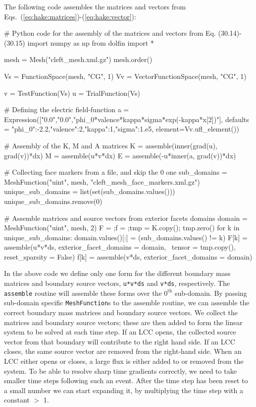 The following \pydolfin code assembles the matrices and vectors from
Eqs.~(\ref{eq:hake:matrices})-(\ref{eq:hake:vector}):
\begin{python}
# Python code for the assembly of the matrices and vectors from Eq. (30.14)-(30.15)
import numpy as np
from dolfin import *

mesh = Mesh("cleft_mesh.xml.gz")
mesh.order()

Vs = FunctionSpace(mesh, "CG", 1)
Vv = VectorFunctionSpace(mesh, "CG", 1)

v = TestFunction(Vs)
u = TrialFunction(Vs)

# Defining the electric field-function
a = Expression(["0.0","0.0","phi_0*valence*kappa*sigma*exp(-kappa*x[2])"],
               defaults = {"phi_0":-2.2,"valence":2,"kappa":1,"sigma":1.e5},
               element=Vv.ufl_element())

# Assembly of the K, M and A matrices
K = assemble(inner(grad(u), grad(v))*dx)
M = assemble(u*v*dx)
E = assemble(-u*inner(a, grad(v))*dx)

# Collecting face markers from a file, and skip the 0 one
sub_domains = MeshFunction("uint", mesh, "cleft_mesh_face_markers.xml.gz")
unique_sub_domains = list(set(sub_domains.values()))
unique_sub_domains.remove(0)

# Assemble matrices and source vectors from exterior facets domains
domain = MeshFunction("uint", mesh, 2)
F = {};f = {};tmp = K.copy(); tmp.zero()
for k in unique_sub_domains:
    domain.values()[:] = (sub_domains.values() != k)
    F[k] = assemble(u*v*ds, exterior_facet_domains = domain, \
                    tensor = tmp.copy(), reset_sparsity = False)
    f[k] = assemble(v*ds, exterior_facet_domains = domain)
\end{python}
In the above code we define only one form for the different boundary
mass matrices and boundary source vectors, \texttt{u*v*ds} and
\texttt{v*ds}, respectively. The \texttt{assemble} routine will
assemble these forms over the $0^{\scriptscriptstyle\text{th}}$
sub-domain. By passing sub-domain specific \texttt{MeshFunction}s to
the assemble routine, we can assemble the correct boundary mass
matrices and boundary source vectors. We collect the matrices and
boundary source vectors; these are then added to form the linear
system to be solved at each time step. If an LCC opens, the collected
source vector from that boundary will contribute to the right hand
side. If an LCC closes, the same source vector are removed from the
right-hand side. When an LCC either opens or closes, a large flux is
either added to or removed from the system. To be able to resolve
sharp time gradients correctly, we need to take smaller time steps
following such an event. After the time step has been reset to a small
number we can start expanding it, by multiplying the time step with a
constant $>$ 1.\par

